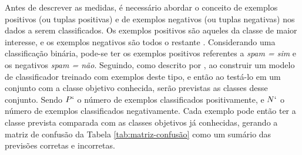         Antes de descrever as medidas, é necessário abordar o conceito de exemplos positivos (ou tuplas positivas) e de exemplos negativos (ou tuplas negativas) nos dados a serem classificados. 
        Os exemplos positivos são aqueles da classe de maior interesse, e os exemplos negativos são todos o restante \cite[p.~364]{Han:2011:DMC:1972541}.
        Considerando uma classificação binária, pode-se ter os exemplos positivos referentes a \textit{spam = sim} e os negativos \textit{spam = não}.
        Seguindo, como descrito por \cite[p.~364--365]{Han:2011:DMC:1972541}, ao construir um modelo de classificador treinado com exemplos deste tipo, e então ao testá-lo em um conjunto com a classe objetivo conhecida, serão previstas as classes desse conjunto.
        Sendo $P`$ o número de exemplos classificados positivamente, e $N`$ o número de exemplos classificados negativamente. 
        Cada exemplo pode então ter a classe prevista comparada com as classes objetivos já conhecidas, gerando a matriz de confusão da Tabela \ref{tab:matriz-confusão} como um sumário das previsões corretas e incorretas.


        
        
